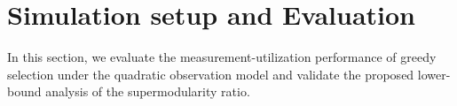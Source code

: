 \documentclass[letterpaper, 10 pt, conference]{ieeeconf}  %
\begin{document}
\section{Simulation setup and Evaluation}

%

In this section, we evaluate the measurement-utilization performance of greedy selection under the quadratic observation model and validate the proposed lower-bound analysis of the supermodularity ratio.
\end{document}
